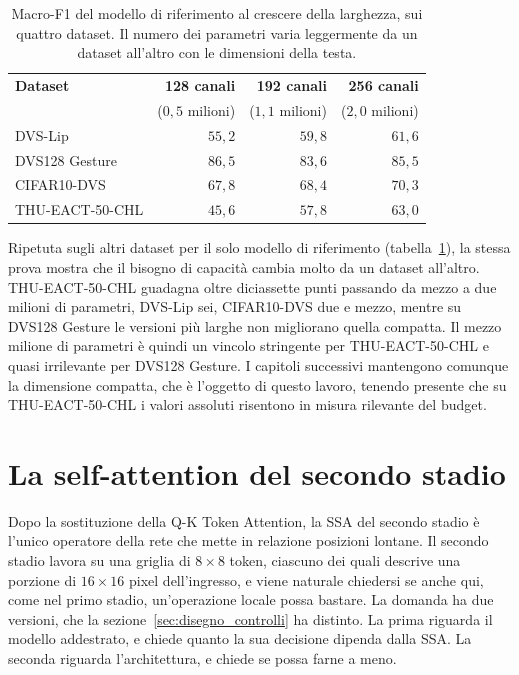\begin{table}[t]
\centering
\small
\renewcommand{\arraystretch}{1.2}
\caption[Capacità del modello di riferimento sui quattro dataset]{Macro-F1 del modello di riferimento al crescere della larghezza, sui quattro dataset. Il numero dei parametri varia leggermente da un dataset all'altro con le dimensioni della testa.}
\label{tab:capacita_dataset}
\begin{tabular}{@{}l r r r@{}}
\hline
\textbf{Dataset} & \textbf{128 canali} & \textbf{192 canali} & \textbf{256 canali} \\
 & {\footnotesize($0{,}5$ milioni)} & {\footnotesize($1{,}1$ milioni)} & {\footnotesize($2{,}0$ milioni)} \\
\hline
DVS-Lip & $55{,}2$ & $59{,}8$ & $61{,}6$ \\
DVS128 Gesture & $86{,}5$ & $83{,}6$ & $85{,}5$ \\
CIFAR10-DVS & $67{,}8$ & $68{,}4$ & $70{,}3$ \\
THU-EACT-50-CHL & $45{,}6$ & $57{,}8$ & $63{,}0$ \\
\hline
\end{tabular}
\end{table}

Ripetuta sugli altri dataset per il solo modello di riferimento (tabella~\ref{tab:capacita_dataset}), la stessa prova mostra che il bisogno di capacità cambia molto da un dataset all'altro. THU-EACT-50-CHL guadagna oltre diciassette punti passando da mezzo a due milioni di parametri, DVS-Lip sei, CIFAR10-DVS due e mezzo, mentre su DVS128 Gesture le versioni più larghe non migliorano quella compatta. Il mezzo milione di parametri è quindi un vincolo stringente per THU-EACT-50-CHL e quasi irrilevante per DVS128 Gesture. I capitoli successivi mantengono comunque la dimensione compatta, che è l'oggetto di questo lavoro, tenendo presente che su THU-EACT-50-CHL i valori assoluti risentono in misura rilevante del budget.



\section{La self-attention del secondo stadio}
\label{sec:ssa_secondo_stadio}

Dopo la sostituzione della Q-K Token Attention, la SSA del secondo stadio è l'unico operatore della rete che mette in relazione posizioni lontane. Il secondo stadio lavora su una griglia di $8\times8$ token, ciascuno dei quali descrive una porzione di $16\times16$ pixel dell'ingresso, e viene naturale chiedersi se anche qui, come nel primo stadio, un'operazione locale possa bastare. La domanda ha due versioni, che la sezione~\ref{sec:disegno_controlli} ha distinto. La prima riguarda il modello addestrato, e chiede quanto la sua decisione dipenda dalla SSA. La seconda riguarda l'architettura, e chiede se possa farne a meno.

